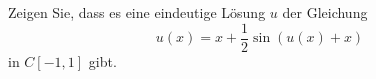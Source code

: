 Zeigen Sie, dass es eine eindeutige Lösung $u$ der Gleichung
\begin{equation*}
u(x) = x + \frac{1}{2}\sin(u(x)+x)
\end{equation*}
in $C[-1,1]$ gibt.
